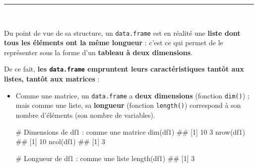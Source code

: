 \documentclass[12pt,twosided, notitlepage]{book}
\newenvironment{Shaded}{}{}
\newcommand{\CommentTok}[1]{\textcolor[rgb]{0.00,0.50,0.00}{#1}}
\newcommand{\KeywordTok}[1]{\textcolor[rgb]{0.00,0.00,1.00}{#1}}
\newcommand{\NormalTok}[1]{#1}
\renewenvironment{Shaded}{\begin{snugshade}}{\end{snugshade}}
\begin{document}
\begin{center}\rule{0.5\linewidth}{\linethickness}\end{center}

~

Du point de vue de sa structure, un \texttt{data.frame} est en réalité
une \textbf{liste dont tous les éléments ont la même longueur} : c'est
ce qui permet de le représenter sous la forme d'un \textbf{tableau à
deux dimensions}.

\begin{Shaded}
\end{Shaded}

De ce fait, \textbf{les \texttt{data.frame} empruntent leurs
caractéristiques tantôt aux listes, tantôt aux matrices} :

\begin{itemize}
\item
  Comme une matrice, un \texttt{data.frame} a \textbf{deux dimensions}
  (fonction
  \texttt{dim()})
  ; mais comme une liste, sa \textbf{longueur} (fonction
  \texttt{length()}) correspond à son nombre
  d'éléments (son nombre de variables).

\begin{Shaded}
\begin{Highlighting}[]
\CommentTok{# Dimensions de df1 : comme une matrice}
\KeywordTok{dim}\NormalTok{(df1)}
\NormalTok{  ## [1] 10  3}
\KeywordTok{nrow}\NormalTok{(df1)}
\NormalTok{  ## [1] 10}
\KeywordTok{ncol}\NormalTok{(df1)}
\NormalTok{  ## [1] 3}

\CommentTok{# Longueur de df1 : comme une liste}
\KeywordTok{length}\NormalTok{(df1)}
\NormalTok{  ## [1] 3}
\end{Highlighting}
\end{Shaded}
\end{itemize}

~
\end{document}
